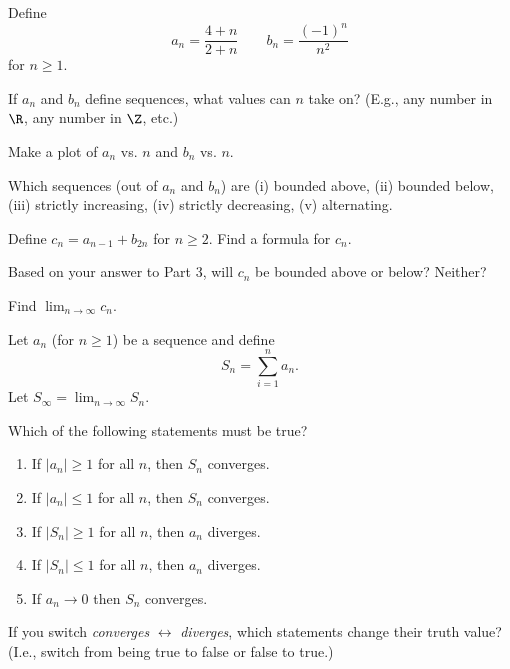 \documentclass{workbook}
\begin{document}
\begin{slide}
	\question
	Define \[
		a_n = \frac{4+n}{2+n} \qquad b_n = \frac{(-1)^n}{n^2}
	\]
	for $n\geq 1$.

	\begin{parts}
		\item If $a_n$ and $b_n$ define sequences, what values can $n$ take on? (E.g., any number in $\R$, any number in $\Z$, etc.)
		\item Make a plot of $a_n$ vs. $n$ and $b_n$ vs. $n$.
		\item Which sequences (out of $a_n$ and $b_n$) are (i) bounded above, (ii) bounded below,
		(iii) strictly increasing, (iv) strictly decreasing, (v) alternating.

		\item Define $c_n=a_{n-1} + b_{2n}$ for $n\geq 2$. Find a formula for $c_n$.

		\item Based on your answer to Part 3, will $c_n$ be bounded above or below?	Neither?

		\item Find $\displaystyle \lim_{n\to\infty} c_n$.
	\end{parts}
\end{slide}

\begin{slide}
	\question
	Let $a_n$ (for $n\geq 1$) be a sequence and define 
	\[
	S_n = \sum_{i=1}^n a_n.
	\]
	Let $S_\infty = \lim_{n\to\infty } S_n$.

	\begin{parts}
		\parbox{\textwidth}{
		\item Which of the following statements must be true?

		\begin{enumerate}
			\item If $|a_n| \geq 1$ for all $n$, then $S_n$ converges.
			\item If $|a_n| \leq 1$ for all $n$, then $S_n$ converges.
			\item If $|S_n| \geq 1$ for all $n$, then $a_n$ diverges.
			\item If $|S_n| \leq 1$ for all $n$, then $a_n$ diverges.
			\item If $a_n\to 0$ then $S_n$ converges.

		\end{enumerate}
		}

		\bigskip
		\bigskip
		\item If you switch \emph{converges} $\leftrightarrow$ \emph{diverges},
		which statements change their truth value? (I.e., switch from being true to false or
		false to true.)
	\end{parts}
\end{slide}
\end{document}
